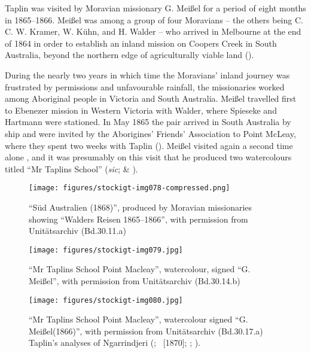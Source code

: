 Taplin was visited by Moravian missionary G. Meißel for a period of eight months in 1865--1866. Meißel was among a group of four Moravians – the others being C. C. W. Kramer, W. Kühn, and H. Walder – who arrived in Melbourne at the end of 1864 in order to establish an inland mission on Coopers Creek in South Australia, beyond the northern edge of agriculturally viable land ().

During the nearly two years in which time the Moravians' inland journey was frustrated by permissions and unfavourable rainfall, the missionaries worked among Aboriginal people in Victoria and South Australia. Meißel travelled first to Ebenezer mission in Western Victoria with Walder, where Spieseke and Hartmann were stationed. In May 1865 the pair arrived in South Australia by ship and were invited by the Aborigines' Friends' Association to Point McLeay, where they spent two weeks with Taplin (). Meißel visited again a second time alone \citep[210--212]{edwards_moravian_2007}, and it was presumably on this visit that he produced two watercolours titled “Mr Taplins School” (\textit{sic};  \& ).

\begin{figure}[p]
\texttt{[image: figures/stockigt-img078-compressed.png]}
\caption{“Süd Australien (1868)'', produced by Moravian missionaries showing “Walders Reisen 1865--1866'', with permission from Unitätsarchiv (Bd.30.11.a)}
\label{bkm:Ref77325656}\label{fig:key:7-77}
\end{figure}

\begin{figure}[p]
\texttt{[image: figures/stockigt-img079.jpg]}
\caption{“Mr Taplins School Point Macleay'', watercolour, signed “G. Meißel'', with permission from Unitätsarchiv (Bd.30.14.b)}
\label{bkm:Ref76459178}\label{fig:key:7-132}
\end{figure}


\begin{figure}
\texttt{[image: figures/stockigt-img080.jpg]}
\caption{“Mr Taplins School Point Macleay'', watercolour signed “G. Meißel(1866)'', with permission from Unitätsarchiv (Bd.30.17.a) Taplin’s analyses of Ngarrindjeri (\citeyear{taplin_vocabulary_1867}; \citeyear{taplin_notes_1872}~[1870]; \citeyear{taplin_native_1874}; \citeyear{taplin_grammar_1878}).}
\label{bkm:Ref76459209}\label{bkm:Ref73602819}\label{fig:key:7-133}
\end{figure}

